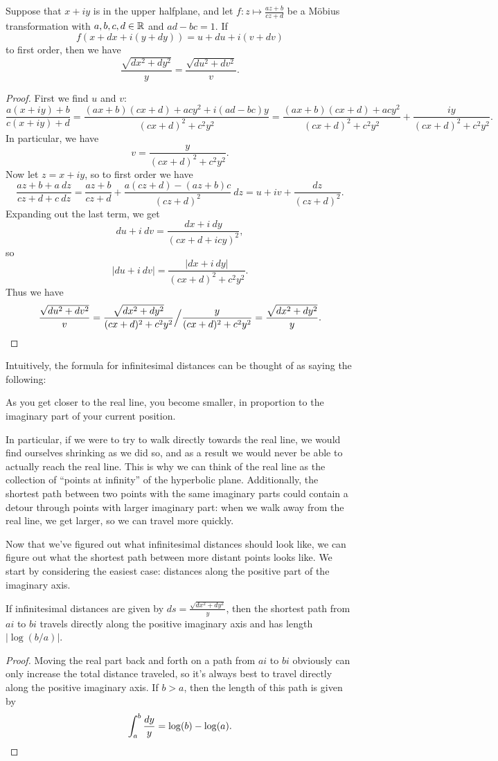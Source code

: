 \begin{prop} Suppose that $x+iy$ is in the upper halfplane, and let $f : z \mapsto \frac{az + b}{cz + d}$ be a M\"obius transformation with $a,b,c,d \in \mathbb{R}$ and $ad - bc = 1$. If
\[
f(x+ dx +i(y + dy)) = u + du + i(v + dv)
\]
to first order, then we have
\[
\frac{\sqrt{dx^2 + dy^2}}{y} = \frac{\sqrt{du^2 + dv^2}}{v}.
\]
\end{prop}
\begin{proof} First we find $u$ and $v$:
\[
\frac{a(x+iy) + b}{c(x+iy) + d} = \frac{(ax+b)(cx+d) + acy^2 + i(ad - bc)y}{(cx+d)^2 + c^2y^2} = \frac{(ax+b)(cx+d) + acy^2}{(cx+d)^2+c^2y^2} + \frac{iy}{(cx+d)^2+c^2y^2}.
\]
In particular, we have
\[
v = \frac{y}{(cx+d)^2 + c^2y^2}.
\]
Now let $z = x+iy$, so to first order we have
\[
\frac{az+b+a\ dz}{cz+d + c\ dz} = \frac{az+b}{cz+d} + \frac{a(cz+d) - (az+b)c}{(cz+d)^2}\ dz = u + iv + \frac{dz}{(cz+d)^2}.
\]
Expanding out the last term, we get
\[
du + i\ dv = \frac{dx + i\ dy}{(cx+d + icy)^2},
\]
so
\[
|du + i\ dv| = \frac{|dx + i\ dy|}{(cx+d)^2 + c^2y^2}.
\]
Thus we have
\[
\frac{\sqrt{du^2 + dv^2}}{v} = \frac{\sqrt{dx^2+dy^2}}{(cx+d)^2 + c^2y^2}\Big/\frac{y}{(cx+d)^2 + c^2y^2} = \frac{\sqrt{dx^2 + dy^2}}{y}.\qedhere
\]
\end{proof}

Intuitively, the formula for infinitesimal distances can be thought of as saying the following:
\begin{center}
As you get closer to the real line, you become smaller, in proportion to the imaginary part of your current position.
\end{center}
In particular, if we were to try to walk directly towards the real line, we would find ourselves shrinking as we did so, and as a result we would never be able to actually reach the real line. This is why we can think of the real line as the collection of ``points at infinity'' of the hyperbolic plane. Additionally, the shortest path between two points with the same imaginary parts could contain a detour through points with larger imaginary part: when we walk away from the real line, we get larger, so we can travel more quickly.

Now that we've figured out what infinitesimal distances should look like, we can figure out what the shortest path between more distant points looks like. We start by considering the easiest case: distances along the positive part of the imaginary axis.

\begin{prop} If infinitesimal distances are given by $ds = \frac{\sqrt{dx^2 + dy^2}}{y}$, then the shortest path from $ai$ to $bi$ travels directly along the positive imaginary axis and has length $|\log(b/a)|$.
\end{prop}
\begin{proof} Moving the real part back and forth on a path from $ai$ to $bi$ obviously can only increase the total distance traveled, so it's always best to travel directly along the positive imaginary axis. If $b > a$, then the length of this path is given by
\[
\int_a^b \frac{dy}{y} = \log(b) - \log(a).\qedhere
\]
\end{proof}

